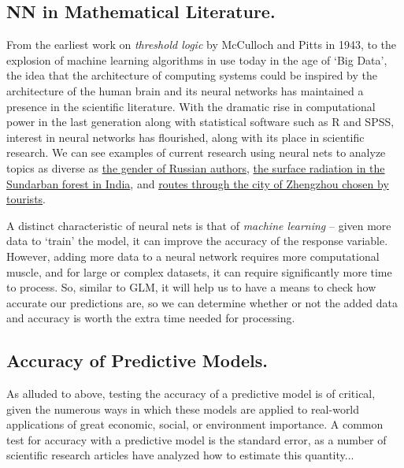 \documentclass[12pt]{article}
\begin{document}
	\subsection{NN in Mathematical Literature.}
		From the earliest work on \textit{threshold logic} by McCulloch and Pitts in 1943, to the explosion of machine learning algorithms
in use today in the age of `Big Data', the idea that the architecture of computing systems could be inspired by the architecture of the human brain
and its neural networks has maintained a presence in the scientific literature.  With the dramatic rise in computational power in the last 
generation along with statistical software such as R and SPSS, interest in neural networks has flourished, along with its place in scientific
research.  We can see examples of current research using neural nets to analyze topics as diverse as 
\href{https://www.sciencedirect.com/science/article/pii/S1877050918300656}{the gender of Russian authors},
\href{https://www.sciencedirect.com/science/article/pii/S2468203916300024}{the surface radiation in the Sundarban forest in India}, and 
\href{https://www.sciencedirect.com/science/article/pii/S1877050917303617}{routes through the city of Zhengzhou chosen by tourists}.
		
A distinct characteristic of neural nets is that of \textit{machine learning} -- given more data to `train' the model, it can improve the accuracy
of the response variable.  However, adding more data to a neural network requires more computational muscle, and for large or complex datasets,
it can require significantly more time to process.  So, similar to GLM, it will help us to have a means to check how accurate our predictions are,
so we can determine whether or not the added data and accuracy is worth the extra time needed for processing.


	\subsection{Accuracy of Predictive Models.}
	As alluded to above, testing the accuracy of a predictive model is of critical, given the numerous ways in which these models are applied to real-world applications of great economic, social, or environment importance.  A common test for accuracy with a predictive model is the standard error, as a number of scientific research articles have analyzed how to estimate this quantity...
\end{document}
